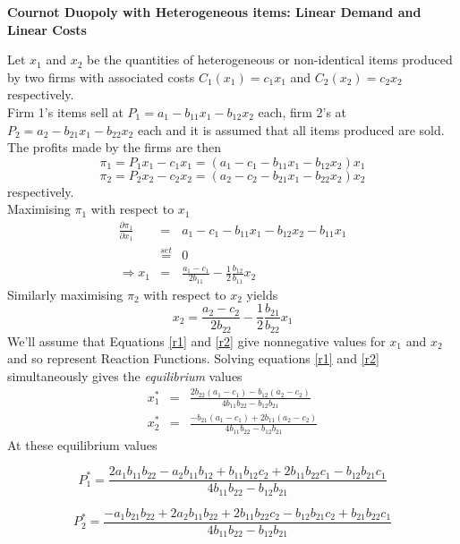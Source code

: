 \documentclass[12pt]{article}
\begin{document}
\begin{center}
\textbf{Cournot Duopoly with Heterogeneous items: Linear Demand and Linear Costs %
}
\end{center}
Let $x_1$ and $x_2$ be the quantities of heterogeneous or non-identical items produced by two firms with associated costs $C_1(x_1) = c_1x_1$ and $C_2(x_2)= c_2x_2$ respectively.\\
Firm 1's items sell at $P_1 = a_1 - b_{11}x_1-b_{12}x_2$ each, firm 2's at $P_2 = a_2 - b_{21}x_1-b_{22}x_2$ each and it is assumed that all items produced are sold. \\ The profits made by the firms are then
$$ \pi_1 = P_1 x_1 - c_1 x_1 = \left(a_1-c_1 - b_{11}x_1 - b_{12}x_2\right)x_1$$
$$ \pi_2 = P_2 x_2 - c_2 x_2 =\left(a_2-c_2 - b_{21}x_1 - b_{22}x_2\right)x_2$$
respectively.\\
Maximising $\pi_1$ with respect to $x_1$
\begin{eqnarray}
 \frac{\partial \pi_1} {\partial x_1} &=& a_1-c_1 - b_{11}x_1 - b_{12}x_2 - b_{11}x_1 \nonumber \\
 & \stackrel{set}{=} & 0 \nonumber \\
 \Rightarrow x_1 &=& \frac{a_1-c_1}{2b_{11}} - \frac{1}{2}\frac{b_{12}}{b_{11}} x_2 \label{r1}
 \end{eqnarray}
 Similarly maximising $\pi_2$ with respect to $x_2$ yields
 \begin{equation} x_2 =  \frac{a_2-c_2}{2b_{22}} - \frac{1}{2}\frac{b_{21}}{b_{22}} x_1 \label{r2} \end{equation}
 We'll assume that Equations \ref{r1} and \ref{r2} give nonnegative values for $x_1$ and $x_2$ and so represent Reaction Functions.
 Solving equations \ref{r1} and \ref{r2} simultaneously gives the \textit{equilibrium} values
 \begin{eqnarray*}
   x^*_1 &=& \frac{2b_{22}(a_1-c_1)-b_{12}(a_2-c_2)}{4b_{11}b_{22}-b_{12}b_{21}} \\
   x^*_2 &=& \frac{-b_{21}(a_1-c_1)+2b_{11}(a_2-c_2)}{4b_{11}b_{22}-b_{12}b_{21}}
 \end{eqnarray*}
 At these equilibrium values

$$P^*_1  = \frac{2a_1b_{11} b_{22} - a_2 b_{11} b_{12} + b_{11} b_{12} c_2
  + 2 b_{11} b_{22} c_1 - b_{12} b_{21} c_1}{4 b_{11} b_{22} - b_{12} b_{21}}$$

$$P^*_2  = \frac{-a_1b_{21} b_{22} + 2a_2 b_{11} b_{22} +2 b_{11} b_{22} c_2
  -  b_{12} b_{21} c_2 + b_{21} b_{22} c_1}{4 b_{11} b_{22} - b_{12} b_{21}}$$
\end{document}
